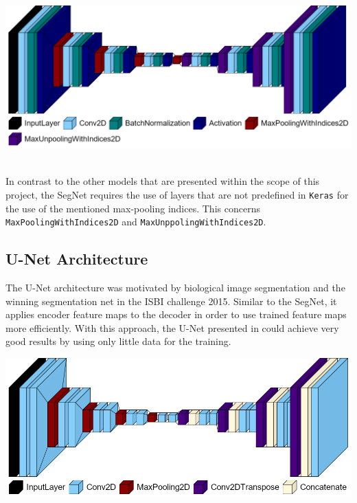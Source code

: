 \begin{minipage}[t]{\textwidth}
    \centering
    \hspace{-1cm}
	\includegraphics[width=\textwidth]{Images/model_plot/segnet.png}
	\label{fig:architetcture_segnet}
	\vspace{5mm}
\end{minipage}\\
In contrast to the other models that are presented within the scope of this project, the SegNet requires the use of layers that are not predefined in \verb|Keras| for the use of the mentioned max-pooling indices. This concerns \verb|MaxPoolingWithIndices2D| and \verb|MaxUnppolingWithIndices2D|.

\subsection{U-Net Architecture}
The U-Net architecture was motivated by biological image segmentation and the winning segmentation net in the ISBI challenge 2015. Similar to the SegNet, it applies encoder feature maps to the decoder in order to use trained feature maps more efficiently. With this approach, the U-Net presented in \cite{Ronneberger.2015} could achieve very good results by using only little data for the training.\\

\begin{minipage}[t]{\textwidth}
	\includegraphics[width=\textwidth]{Images/model_plot/unet.png}
	\label{fig:architetcture_unet}
\end{minipage}

